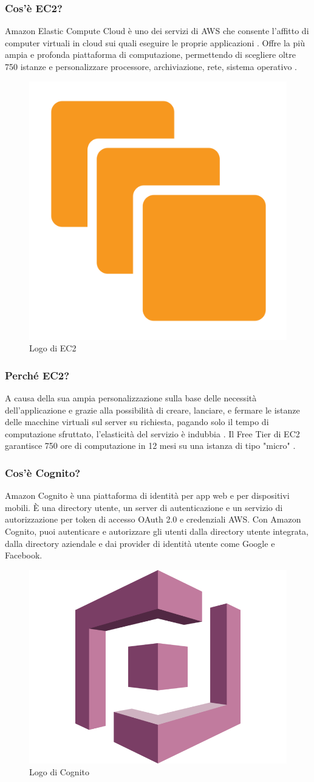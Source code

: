             \subsubsection{Cos'è EC2?}
                Amazon Elastic Compute Cloud è uno dei servizi di AWS che consente l'affitto di computer virtuali in cloud sui quali eseguire le proprie applicazioni \cite{Wikipedia6}. Offre la più ampia e profonda piattaforma di computazione, permettendo di scegliere oltre 750 istanze e personalizzare processore, archiviazione, rete, sistema operativo \cite{AWS2}.
            \begin{figure}[htbp!]
                \centering
                \includegraphics[width=0.2\linewidth]{Immagini/System Design/AWS EC2.png}
                \caption{Logo di EC2}
            \end{figure}
            \subsubsection{Perché EC2?}
                A causa della sua ampia personalizzazione sulla base delle necessità dell'applicazione e grazie alla possibilità di creare, lanciare, e fermare le istanze delle macchine virtuali sul server su richiesta, pagando solo il tempo di computazione sfruttato, l'elasticità del servizio è indubbia \cite{Wikipedia6}. Il Free Tier di EC2 garantisce 750 ore di computazione in 12 mesi su una istanza di tipo "micro" \cite{AWS3}.
            \subsubsection{Cos'è Cognito? \cite{AWS4}} 
            Amazon Cognito è una piattaforma di identità per app web e per dispositivi mobili. È una directory utente, un server di autenticazione e un servizio di autorizzazione per token di accesso OAuth 2.0 e credenziali AWS. Con Amazon Cognito, puoi autenticare e autorizzare gli utenti dalla directory utente integrata, dalla directory aziendale e dai provider di identità utente come Google e Facebook.
            \begin{figure}[htbp!]
                \centering
                \includegraphics[width=0.2\linewidth]{Immagini/System Design/AWS Cognito.png}
                \caption{Logo di Cognito}
            \end{figure}

